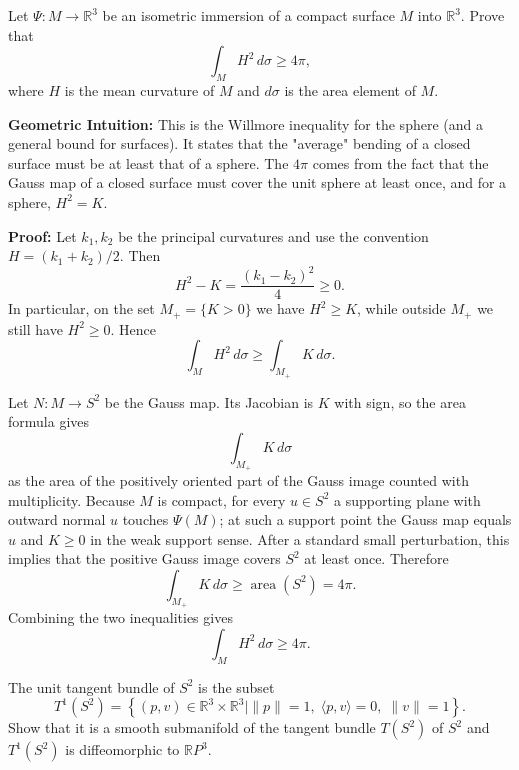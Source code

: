 \begin{exercise}
\label{geometry:2014:5}
Let $\Psi : M \to \mathbb{R}^{3}$ be an isometric immersion of a compact surface $M$ into $\mathbb{R}^{3}$. Prove that
\[ \int_{M} H^{2}\,d\sigma \geq 4\pi, \]
where $H$ is the mean curvature of $M$ and $d\sigma$ is the area element of $M$.
\end{exercise}

\begin{solution}
\textbf{Geometric Intuition:} This is the Willmore inequality for the sphere (and a general bound for surfaces). It states that the "average" bending of a closed surface must be at least that of a sphere. The $4\pi$ comes from the fact that the Gauss map of a closed surface must cover the unit sphere at least once, and for a sphere, $H^2 = K$.

\textbf{Proof:} Let $k_1,k_2$ be the principal curvatures and use the convention $H=(k_1+k_2)/2$. Then
\[
H^2-K=\frac{(k_1-k_2)^2}{4}\geq 0.
\]
In particular, on the set $M_+=\{K>0\}$ we have $H^2\geq K$, while outside $M_+$ we still have $H^2\geq 0$. Hence
\[
\int_M H^2\,d\sigma\geq \int_{M_+}K\,d\sigma.
\]

Let $N:M\to S^2$ be the Gauss map. Its Jacobian is $K$ with sign, so the area formula gives
\[
\int_{M_+}K\,d\sigma
\]
as the area of the positively oriented part of the Gauss image counted with multiplicity. Because $M$ is compact, for every $u\in S^2$ a supporting plane with outward normal $u$ touches $\Psi(M)$; at such a support point the Gauss map equals $u$ and $K\geq 0$ in the weak support sense. After a standard small perturbation, this implies that the positive Gauss image covers $S^2$ at least once. Therefore
\[
\int_{M_+}K\,d\sigma\geq \operatorname{area}(S^2)=4\pi.
\]
Combining the two inequalities gives
\[
\int_M H^2\,d\sigma\geq 4\pi.
\]
\end{solution}

\begin{exercise}
\label{geometry:2014:6}
The unit tangent bundle of $S^{2}$ is the subset
\[ T^{1}(S^{2}) = \left\{(p, v) \in \mathbb{R}^{3} \times \mathbb{R}^{3} \mid \|p\| = 1,\; \langle p, v \rangle = 0,\; \|v\| = 1\right\}. \]
Show that it is a smooth submanifold of the tangent bundle $T(S^{2})$ of $S^{2}$ and $T^{1}(S^{2})$ is diffeomorphic to $\mathbb{R}P^{3}$.
\end{exercise}

